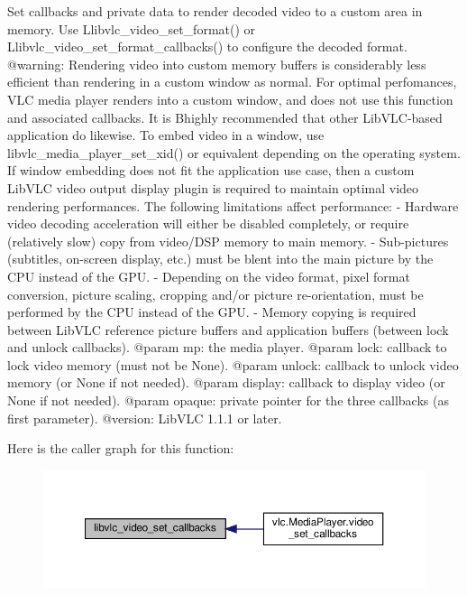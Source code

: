 \begin{DoxyVerb}Set callbacks and private data to render decoded video to a custom area
in memory.
Use L{libvlc_video_set_format}() or L{libvlc_video_set_format_callbacks}()
to configure the decoded format.
@warning: Rendering video into custom memory buffers is considerably less
efficient than rendering in a custom window as normal.
For optimal perfomances, VLC media player renders into a custom window, and
does not use this function and associated callbacks. It is B{highly
recommended} that other LibVLC-based application do likewise.
To embed video in a window, use libvlc_media_player_set_xid() or equivalent
depending on the operating system.
If window embedding does not fit the application use case, then a custom
LibVLC video output display plugin is required to maintain optimal video
rendering performances.
The following limitations affect performance:
- Hardware video decoding acceleration will either be disabled completely,
  or require (relatively slow) copy from video/DSP memory to main memory.
- Sub-pictures (subtitles, on-screen display, etc.) must be blent into the
  main picture by the CPU instead of the GPU.
- Depending on the video format, pixel format conversion, picture scaling,
  cropping and/or picture re-orientation, must be performed by the CPU
  instead of the GPU.
- Memory copying is required between LibVLC reference picture buffers and
  application buffers (between lock and unlock callbacks).
@param mp: the media player.
@param lock: callback to lock video memory (must not be None).
@param unlock: callback to unlock video memory (or None if not needed).
@param display: callback to display video (or None if not needed).
@param opaque: private pointer for the three callbacks (as first parameter).
@version: LibVLC 1.1.1 or later.
\end{DoxyVerb}
 Here is the caller graph for this function\+:
\nopagebreak
\begin{figure}[H]
\begin{center}
\leavevmode
\includegraphics[width=350pt]{namespacevlc_abbf3342ec38822cac666ab799e12c0e0_icgraph}
\end{center}
\end{figure}
\mbox{\label{namespacevlc_abdfc647c45f0b22d8aa3ad8f87b9bd12}} 
